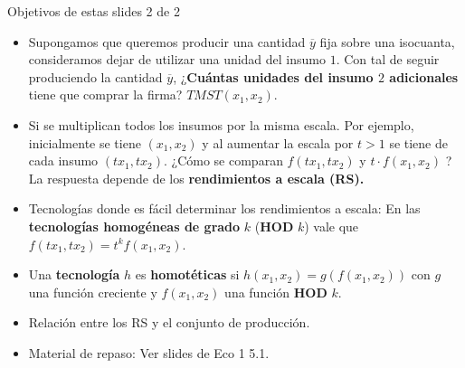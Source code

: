 \documentclass{beamer}
\theoremstyle{definition}
\begin{document}
        	\begin{frame}{Objetivos de estas slides 2 de 2}\small
    \begin{itemize}

        \item Supongamos que queremos producir una cantidad $\overline{y}$ fija sobre una isocuanta, consideramos dejar de utilizar una unidad del insumo $1$. Con tal de seguir produciendo la cantidad $\overline{y}$, ¿\textbf{Cuántas unidades del insumo $2$ adicionales} tiene que comprar la firma? $TMST(x_1,x_2)$.
         \item Si se multiplican todos los insumos por la misma escala. Por ejemplo, inicialmente se tiene $(x_1,x_2)$ y al aumentar la escala por $t>1$ se tiene de cada insumo $(tx_1,tx_2)$. ¿Cómo se comparan $f(tx_1,tx_2)$ y $t\cdot f(x_1,x_2)$ ? La respuesta depende de los \textbf{rendimientos a escala (RS).}
         \item Tecnologías donde es fácil determinar los rendimientos a escala: En las \textbf{tecnologías homogéneas de grado} $k$ (\textbf{HOD} $k$) vale que $f(tx_1,tx_2)=t^kf(x_1,x_2)$. 
         \item Una \textbf{tecnología} $h$ es \textbf{homotéticas} si $h(x_1,x_2)=g(f(x_1,x_2))$ con $g$ una función creciente y $f(x_1,x_2)$ una función \textbf{HOD} $k$.
        \item Relación entre los RS y el conjunto de producción.
        \item Material de repaso: Ver slides de Eco 1 5.1.
    \end{itemize}
\end{frame}

\end{document}
